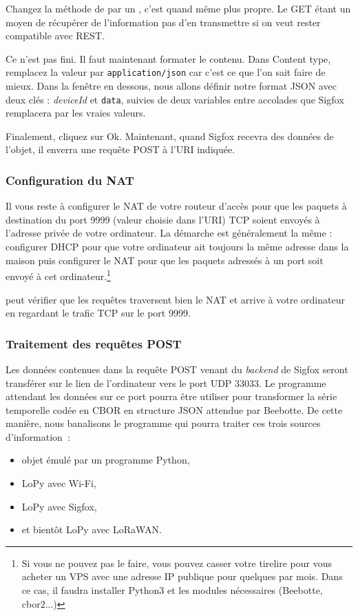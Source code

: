 Changez la méthode de  par un , c’est quand même plus propre. Le GET étant un moyen de récupérer de l’information pas d’en transmettre si on veut rester compatible avec REST.

     \vspace{1em}

Ce n’est pas fini. Il faut maintenant formater le contenu. Dans Content type, remplacez la valeur par \texttt{application/json} car c’est ce que l’on sait faire de mieux. Dans la fenêtre en dessous, nous allons définir notre format JSON avec deux clés : \textit{deviceId} et \texttt{data}, suivies de deux variables entre accolades que Sigfox remplacera par les vraies valeurs.

     \vspace{1em}

Finalement, cliquez sur Ok. Maintenant, quand Sigfox recevra des données de l'objet, il enverra une requête POST à l'URI indiquée.

\subsubsection{Configuration du NAT}

Il vous reste à configurer le NAT de votre routeur d’accès pour que les paquets à destination du port 9999 (valeur choisie dans l’URI) TCP soient envoyés à l’adresse privée de votre ordinateur. La démarche est généralement la même : configurer DHCP pour que votre ordinateur ait toujours la même adresse dans la maison puis configurer le NAT pour que les paquets adressés à un port soit envoyé à cet ordinateur.\footnote{Si vous ne pouvez pas le faire, vous pouvez casser votre tirelire pour vous acheter un \ac{VPS} avec une adresse IP publique pour quelques par mois. Dans ce cas, il faudra installer Python3 et les modules nécessaires (Beebotte, cbor2...)}

 peut vérifier que les requêtes traversent bien le NAT et arrive à votre ordinateur en regardant le trafic TCP sur le port 9999.

\subsubsection{Traitement des requêtes POST}

Les données contenues dans la requête POST venant du \textit{backend} de Sigfox seront transférer sur le lien \textit{} de l'ordinateur vers le port UDP 33033.
Le programme  attendant les données sur ce port pourra être utiliser pour transformer la série temporelle codée en CBOR en structure JSON attendue par Beebotte. De cette manière, nous banalisons le programme qui pourra traiter ces trois sources d’information~:
\begin{itemize}
    \item objet émulé par un programme Python,
    \item LoPy avec Wi-Fi,
    \item LoPy avec Sigfox,
    \item et bientôt LoPy avec LoRaWAN.
\end{itemize}

